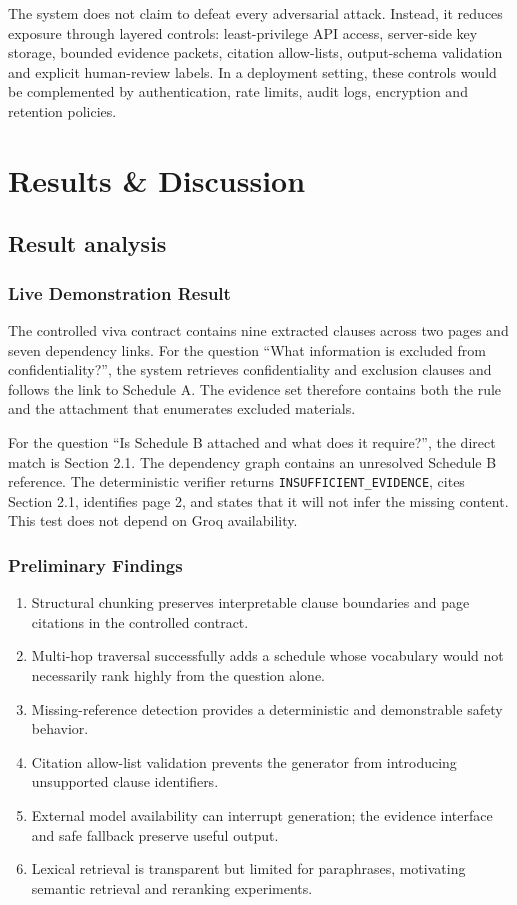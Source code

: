 \documentclass[12pt,a4paper,oneside]{report}
\begin{document}
The system does not claim to defeat every adversarial attack. Instead, it reduces exposure through layered controls: least-privilege API access, server-side key storage, bounded evidence packets, citation allow-lists, output-schema validation and explicit human-review labels. In a deployment setting, these controls would be complemented by authentication, rate limits, audit logs, encryption and retention policies.

\chapter{Results \& Discussion}
\section{Result analysis}
\subsection{Live Demonstration Result}
The controlled viva contract contains nine extracted clauses across two pages and seven dependency links. For the question ``What information is excluded from confidentiality?'', the system retrieves confidentiality and exclusion clauses and follows the link to Schedule A. The evidence set therefore contains both the rule and the attachment that enumerates excluded materials.

For the question ``Is Schedule B attached and what does it require?'', the direct match is Section 2.1. The dependency graph contains an unresolved Schedule B reference. The deterministic verifier returns \texttt{INSUFFICIENT\_EVIDENCE}, cites Section 2.1, identifies page 2, and states that it will not infer the missing content. This test does not depend on Groq availability.

\subsection{Preliminary Findings}
\begin{enumerate}
  \item Structural chunking preserves interpretable clause boundaries and page citations in the controlled contract.
  \item Multi-hop traversal successfully adds a schedule whose vocabulary would not necessarily rank highly from the question alone.
  \item Missing-reference detection provides a deterministic and demonstrable safety behavior.
  \item Citation allow-list validation prevents the generator from introducing unsupported clause identifiers.
  \item External model availability can interrupt generation; the evidence interface and safe fallback preserve useful output.
  \item Lexical retrieval is transparent but limited for paraphrases, motivating semantic retrieval and reranking experiments.
\end{enumerate}
\end{document}
